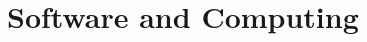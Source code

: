 \ifdefined\isfinal\documentclass[final]{pd-tdr}\else\documentclass{pd-tdr}\fi
\begin{document}
%
%
%
%
%

%

%

%

%

\chapter{Software and Computing}


%

%








% 

\cleardoublepage


\end{document}
